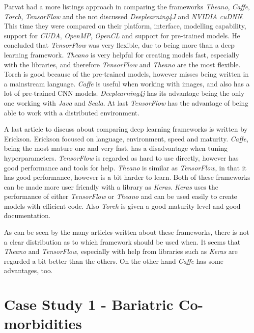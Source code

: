 \documentclass[10pt,a4paper]{report}
\begin{document}
	Parvat had a more listings approach in comparing the frameworks \textit{Theano}, 
	\textit{Caffe}, \textit{Torch},\textit{ TensorFlow} and the not discussed \textit{Deeplearning4J} and \textit{NVIDIA cuDNN}. This time they were compared on their platform, interface, modelling 
	capability, support for \textit{CUDA}, \textit{OpenMP}, \textit{OpenCL} and support for pre-trained 
	models. He concluded that \textit{TensorFlow} was very flexible, due to being more 
	than a deep learning framework. \textit{Theano} is very helpful for creating models 
	fast, especially with the libraries, and therefore \textit{TensorFlow} and \textit{Theano} 
	are the most flexible. Torch is good because of the pre-trained models, 
	however misses being written in a mainstream language. \textit{Caffe} is useful when 
	working with images, and also has a lot of pre-trained CNN models. 
	\textit{Deeplearning4j} has its advantage being the only one working with \textit{Java} and 
	\textit{Scala}. 
	At last \textit{TensorFlow} has the advantage of being able to work with a 
	distributed environment.  \cite{parvat2017survey}
	
	A last article to discuss about comparing deep learning frameworks is 
	written by Erickson. Erickson focused on language, environment, speed and 
	maturity. \textit{Caffe}, being the most mature one and very fast, has a 
	disadvantage when tuning hyperparameters. \textit{TensorFlow} is regarded as hard 
	to use directly, however has good performance and tools for help. \textit{Theano} 
	is similar as \textit{TensorFlow}, in that it has good performance, however is a 
	bit harder to learn. Both of these frameworks can be made more user 
	friendly with a library as \textit{Keras}. \textit{Keras }uses the performance of either 
	\textit{TensorFlow} or \textit{Theano }and can be used easily to create models with 
	efficient code. Also \textit{Torch} is given a good maturity level and good 
	documentation.  \cite{erickson2017toolkits}
	
	As can be seen by the many articles written about these frameworks, there is not a clear distribution as to which framework should be used when. It seems that \textit{Theano} and\textit{ TensorFlow}, especially with help from libraries such as \textit{Keras} are regarded a bit better than the others. On the other hand \textit{Caffe }
	has some advantages, too.
	
	
	
	
	\chapter{Case Study 1 - Bariatric Co-morbidities}
	\label{app:CS1}
	
\end{document}
